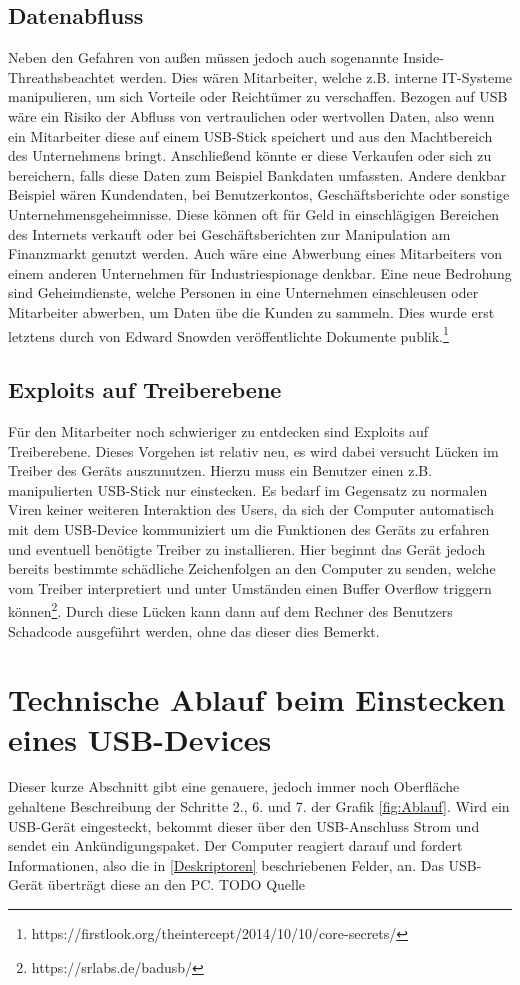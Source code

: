 \subsection{Datenabfluss}
Neben den Gefahren von außen müssen jedoch auch sogenannte \glqq Inside-Threaths\grqq beachtet werden. Dies wären Mitarbeiter, welche z.B. interne IT-Systeme manipulieren, um sich Vorteile oder Reichtümer zu verschaffen. Bezogen auf USB wäre ein Risiko der Abfluss von vertraulichen oder wertvollen Daten, also wenn ein Mitarbeiter diese auf einem USB-Stick speichert und aus den Machtbereich des Unternehmens bringt. Anschließend könnte er diese Verkaufen oder sich zu bereichern, falls diese Daten zum Beispiel Bankdaten umfassten. Andere denkbar Beispiel wären Kundendaten, bei Benutzerkontos, Geschäftsberichte oder sonstige Unternehmensgeheimnisse. Diese können oft für Geld in einschlägigen Bereichen des Internets verkauft oder bei Geschäftsberichten zur Manipulation am Finanzmarkt genutzt werden. Auch wäre eine Abwerbung eines Mitarbeiters von einem anderen Unternehmen für Industriespionage denkbar.
Eine neue Bedrohung sind Geheimdienste, welche Personen in eine Unternehmen einschleusen oder Mitarbeiter abwerben, um Daten übe die Kunden zu sammeln. Dies wurde erst letztens durch von Edward Snowden veröffentlichte Dokumente publik.\footnote{https://firstlook.org/theintercept/2014/10/10/core-secrets/}



\subsection{Exploits auf Treiberebene}
Für den Mitarbeiter noch schwieriger zu entdecken sind Exploits auf Treiberebene. Dieses Vorgehen ist relativ neu, es wird dabei versucht Lücken im Treiber des Geräts auszunutzen. Hierzu muss ein Benutzer einen z.B. manipulierten USB-Stick nur einstecken. Es bedarf im Gegensatz zu normalen Viren keiner weiteren Interaktion des Users, da sich der Computer automatisch mit dem USB-Device kommuniziert um die Funktionen des Geräts zu erfahren und eventuell benötigte Treiber zu installieren. Hier beginnt das Gerät jedoch bereits bestimmte schädliche Zeichenfolgen an den  Computer zu senden, welche vom Treiber interpretiert und unter Umständen einen Buffer Overflow triggern können\footnote{https://srlabs.de/badusb/}. Durch diese Lücken kann dann auf dem Rechner des Benutzers Schadcode ausgeführt werden, ohne das dieser dies Bemerkt.


\section{Technische Ablauf beim Einstecken eines USB-Devices}
Dieser kurze Abschnitt gibt eine genauere, jedoch immer noch Oberfläche gehaltene Beschreibung der Schritte 2., 6. und 7. der Grafik \ref{fig:Ablauf}. Wird ein USB-Gerät eingesteckt, bekommt dieser über den USB-Anschluss Strom und sendet ein Ankündigungspaket. Der Computer reagiert darauf und fordert Informationen, also die in \ref{Deskriptoren} beschriebenen Felder, an. Das USB-Gerät überträgt diese an den PC. TODO Quelle


